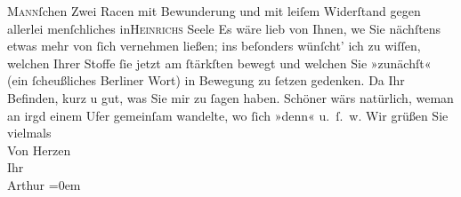 \begin{ledgroupsized}[t]{13cm}
                  \textsc{Mann}ſchen Zwei Racen mit
               Bewunderung und mit  leiſem Widerſtand gegen
               allerlei menſchliches in\textsc{Heinrichs} Seele {\pb}Es wäre lieb von Ihnen, we{\geminationn} Sie nächſtens etwas mehr von ſich vernehmen ließen;
               ins beſonders wünſcht’ ich zu wiſſen, welchen Ihrer Stoffe ſie jetzt am ſtärkſten
               bewegt und welchen Sie »zunächſt« (ein ſcheußliches Berliner Wort) in Bewegung zu ſetzen gedenken. Da{\geminationn} Ihr Befinden, kurz u gut, was Sie mir zu
               ſagen haben. Schöner wärs natürlich, we{\geminationn}{\pb}man an irgd einem Ufer gemeinſam
               wandelte, wo ſich »denn« u. ſ. w. \pend
           \pstart
           Wir grüßen Sie vielmals {\\[\baselineskip]}Von Herzen {\\[\baselineskip]}Ihr {\\[\baselineskip]}\spacefill\mbox{Arthur}\pend
           \leftskip=0em{}
         
         \endnumbering{}\end{ledgroupsized}\begin{anhang}\end{anhang}\newcommand{\dateiname}{L03009}\newcommand{\titel}{Arthur Schnitzler an Felix Salten, 5. 8. 1907}\newcommand{\editorInnen}{Martin Anton Müller und Laura Untner}
      